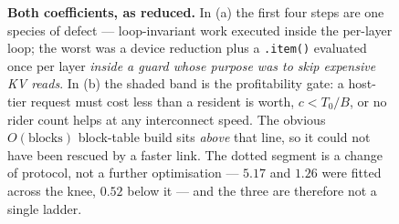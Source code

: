 \begin{figure}[t]
{}
\caption{\textbf{Both coefficients, as reduced.} In (a) the first four steps are
one species of defect --- loop-invariant work executed inside the per-layer loop;
the worst was a device reduction plus a \texttt{.item()} evaluated once per layer
\emph{inside a guard whose purpose was to skip expensive KV reads}. In (b) the
shaded band is the profitability gate: a host-tier request must cost less than a
resident is worth, $c < T_0/B$, or no rider count helps at any interconnect speed.
The obvious $O(\text{blocks})$ block-table build sits \emph{above} that line, so it
could not have been rescued by a faster link. The dotted segment is a change of
protocol, not a further optimisation --- $5.17$ and $1.26$ were fitted across the
knee, $0.52$ below it --- and the three are therefore not a single ladder.}
\label{fig:ladder}
\end{figure}
